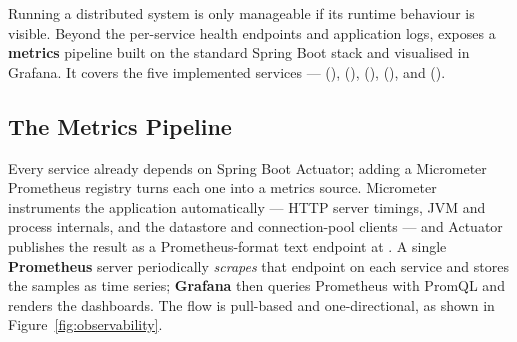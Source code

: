 Running a distributed system is only manageable if its runtime behaviour is
visible. Beyond the per-service health endpoints and application logs, \voname{}
exposes a \textbf{metrics} pipeline built on the standard Spring Boot stack and
visualised in Grafana. It covers the five implemented services --- 
(),  (),  (),
 (), and  ().

\subsection{The Metrics Pipeline}

Every service already depends on Spring Boot Actuator; adding a Micrometer
Prometheus registry turns each one into a metrics source. Micrometer instruments
the application automatically --- HTTP server timings, JVM and process internals,
and the datastore and connection-pool clients --- and Actuator publishes the
result as a Prometheus-format text endpoint at . A
single \textbf{Prometheus} server periodically \emph{scrapes} that endpoint on
each service and stores the samples as time series; \textbf{Grafana} then queries
Prometheus with PromQL and renders the dashboards. The flow is pull-based and
one-directional, as shown in Figure~\ref{fig:observability}.

